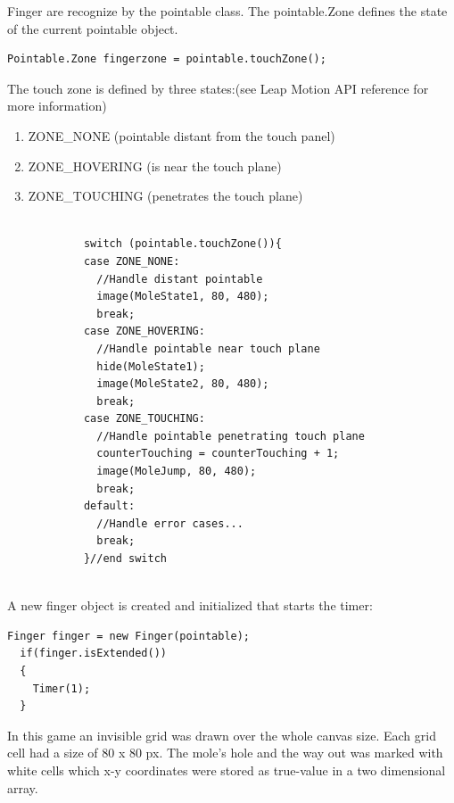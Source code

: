 Finger are recognize by the pointable class. The pointable.Zone defines the state of the current pointable object.

\lstset{language=Java}
\begin{lstlisting}[caption = {The code for touch zone}, label={lst:Java}]
 Pointable.Zone fingerzone = pointable.touchZone();
\end{lstlisting}

The touch zone is defined by three states:(see Leap Motion API reference for more information)
\begin{enumerate}
    \item ZONE\_NONE (pointable distant from the touch panel)
    \item ZONE\_HOVERING (is near the touch plane)
    \item ZONE\_TOUCHING (penetrates the touch plane)
\end{enumerate}




\lstset{language=Java}
\begin{lstlisting}[caption = {The code for touch zone}, label={lst:Java}]

            switch (pointable.touchZone()){
            case ZONE_NONE:
              //Handle distant pointable
              image(MoleState1, 80, 480);
              break;
            case ZONE_HOVERING:
              //Handle pointable near touch plane
              hide(MoleState1);
              image(MoleState2, 80, 480);
              break;
            case ZONE_TOUCHING:
              //Handle pointable penetrating touch plane
              counterTouching = counterTouching + 1;
              image(MoleJump, 80, 480); 
              break;
            default:
              //Handle error cases...
              break;
            }//end switch
          
\end{lstlisting}

A new finger object is created and initialized that starts the timer:

\lstset{language=Java}
\begin{lstlisting}[caption = {The code for touch zone}, label={lst:Java}]
  Finger finger = new Finger(pointable);
  if(finger.isExtended())
  {
    Timer(1);
  }
\end{lstlisting}

\break
In this game an invisible grid was drawn over the whole canvas size. Each grid cell had a size of 80 x 80 px. The mole’s hole and the way out was marked with white cells which x-y coordinates were stored as true-value in a two dimensional array.

